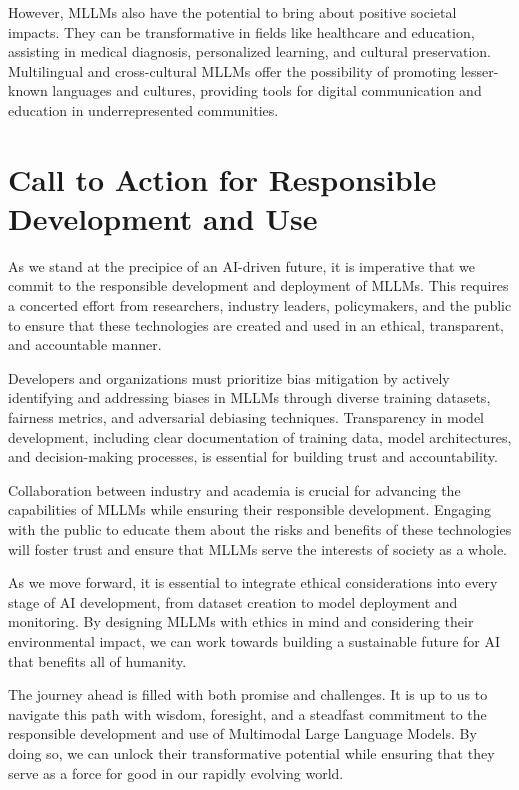 However, MLLMs also have the potential to bring about positive societal impacts. They can be transformative in fields like healthcare and education, assisting in medical diagnosis, personalized learning, and cultural preservation. Multilingual and cross-cultural MLLMs offer the possibility of promoting lesser-known languages and cultures, providing tools for digital communication and education in underrepresented communities.

\section{Call to Action for Responsible Development and Use}

As we stand at the precipice of an AI-driven future, it is imperative that we commit to the responsible development and deployment of MLLMs. This requires a concerted effort from researchers, industry leaders, policymakers, and the public to ensure that these technologies are created and used in an ethical, transparent, and accountable manner.

Developers and organizations must prioritize bias mitigation by actively identifying and addressing biases in MLLMs through diverse training datasets, fairness metrics, and adversarial debiasing techniques. Transparency in model development, including clear documentation of training data, model architectures, and decision-making processes, is essential for building trust and accountability.

Collaboration between industry and academia is crucial for advancing the capabilities of MLLMs while ensuring their responsible development. Engaging with the public to educate them about the risks and benefits of these technologies will foster trust and ensure that MLLMs serve the interests of society as a whole.

As we move forward, it is essential to integrate ethical considerations into every stage of AI development, from dataset creation to model deployment and monitoring. By designing MLLMs with ethics in mind and considering their environmental impact, we can work towards building a sustainable future for AI that benefits all of humanity.

The journey ahead is filled with both promise and challenges. It is up to us to navigate this path with wisdom, foresight, and a steadfast commitment to the responsible development and use of Multimodal Large Language Models. By doing so, we can unlock their transformative potential while ensuring that they serve as a force for good in our rapidly evolving world.


